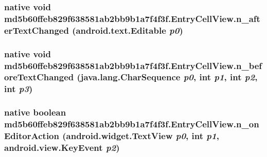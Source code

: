 \hypertarget{classmd5b60ffeb829f638581ab2bb9b1a7f4f3f_1_1_entry_cell_view_e7edff3f42c61efac2657a90a7cf0456}{
\subsubsection[{n\_\-afterTextChanged}]{\setlength{\rightskip}{0pt plus 5cm}native void md5b60ffeb829f638581ab2bb9b1a7f4f3f.EntryCellView.n\_\-afterTextChanged (android.text.Editable {\em p0})}}
\label{classmd5b60ffeb829f638581ab2bb9b1a7f4f3f_1_1_entry_cell_view_e7edff3f42c61efac2657a90a7cf0456}


\hypertarget{classmd5b60ffeb829f638581ab2bb9b1a7f4f3f_1_1_entry_cell_view_34d243c449e7bc60206e9b8d88e03613}{
\subsubsection[{n\_\-beforeTextChanged}]{\setlength{\rightskip}{0pt plus 5cm}native void md5b60ffeb829f638581ab2bb9b1a7f4f3f.EntryCellView.n\_\-beforeTextChanged (java.lang.CharSequence {\em p0}, \/  int {\em p1}, \/  int {\em p2}, \/  int {\em p3})}}
\label{classmd5b60ffeb829f638581ab2bb9b1a7f4f3f_1_1_entry_cell_view_34d243c449e7bc60206e9b8d88e03613}


\hypertarget{classmd5b60ffeb829f638581ab2bb9b1a7f4f3f_1_1_entry_cell_view_d39763bac685bdb01bc26ba3eedca6aa}{
\subsubsection[{n\_\-onEditorAction}]{\setlength{\rightskip}{0pt plus 5cm}native boolean md5b60ffeb829f638581ab2bb9b1a7f4f3f.EntryCellView.n\_\-onEditorAction (android.widget.TextView {\em p0}, \/  int {\em p1}, \/  android.view.KeyEvent {\em p2})}}
\label{classmd5b60ffeb829f638581ab2bb9b1a7f4f3f_1_1_entry_cell_view_d39763bac685bdb01bc26ba3eedca6aa}


